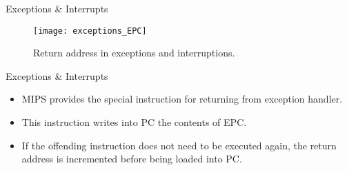 % 
\begin{frame}{Exceptions \& Interrupts}{}
\begin{figure}
\centering
\texttt{[image: exceptions\_EPC]}
\caption{Return address in exceptions and interruptions.}
\label{Figure:exception_EPC}
\end{figure}
\end{frame}

% 
\begin{frame}{Exceptions \& Interrupts}{}
\begin{itemize}
\item \ac{MIPS} provides the special instruction  for returning from exception handler.
\item This instruction writes into \ac{PC} the contents of \ac{EPC}.
\item If the offending instruction does not need to be executed again, the return address is incremented before being loaded into \ac{PC}.
\end{itemize}
\end{frame}

